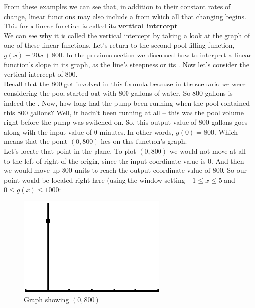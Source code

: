 \bigskip

From these examples we can see that, in addition to their constant rates of change, linear functions may also include a  from which all that changing begins. This  for a linear function is called its \textbf{vertical intercept}.\\

We can see why it is called the vertical intercept by taking a look at the graph of one of these linear functions. Let’s return to the second pool-filling function, $g(x)=20x+800$. In the previous section we discussed how to interpret a linear function’s slope in its graph, as the line’s steepness or its . Now let’s consider the vertical intercept of $800$.\\

Recall that the 800 got involved in this formula because in the scenario we were considering the pool started out with 800 gallons of water. So 800 gallons is indeed the . Now, how long had the pump been running when the pool contained this 800 gallons? Well, it hadn’t been running at all – this was the pool volume right before the pump was switched on. So, this output value of 800 gallons goes along with the input value of 0 minutes. In other words, $g(0)=800$. Which means that the point $(0,800)$ lies on this function’s graph.\\

Let’s locate that point in the plane. To plot $(0,800)$ we would not move at all to the left of right of the origin, since the input coordinate value is 0. And then we would move up 800 units to reach the output coordinate value of 800. So our point would be located right here (using the window setting $-1 \leq x \leq 5$ and $0 \leq g(x) \leq 1000$:

\begin{figure}[H]
	\centering
	\includegraphics[scale=1.0]{Sections/LinearFunctionsandInterceptsImages/Figure01.png}
	\caption{Graph showing $(0,800)$}
\end{figure}


